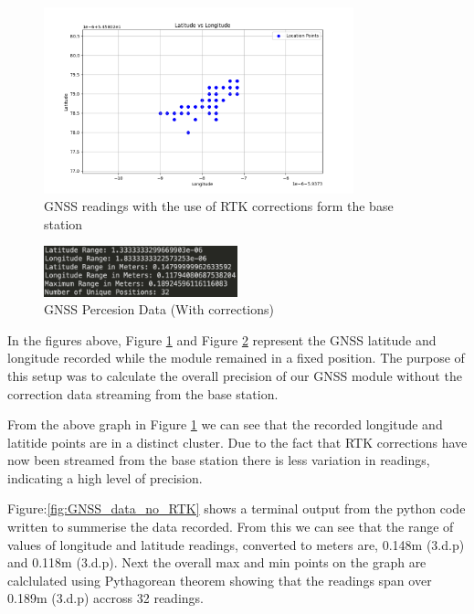 \documentclass{report}
\begin{document}
\begin{figure}[H]
  \centering
  \includegraphics[width=0.8\textwidth]{Pictures/GNSS_RTK.png}
  \caption{GNSS readings with the use of RTK corrections form the base station}
  \label{fig:GNSS_RTK}
\end{figure}

\begin{figure}[H]
  \centering
  \includegraphics[width=0.5\textwidth]{Pictures/GNSS_data_correction.png}
  \caption{GNSS Percesion Data (With corrections)}
  \label{fig:GNSS_data_RTK}
\end{figure}

In the figures above, Figure \ref{fig:GNSS_RTK} and
Figure \ref{fig:GNSS_data_RTK} represent the GNSS latitude and longitude
recorded while the module remained in a fixed position. The purpose of this
setup was to calculate the overall precision of our GNSS module without the
correction data streaming from the base station.

From the above graph in Figure \ref{fig:GNSS_RTK} we can see that the recorded
longitude and latitide points are in a distinct cluster. Due to the fact that
RTK corrections have now been streamed from the base station there is less
variation in readings, indicating a high level of precision.

Figure:\ref{fig:GNSS_data_no_RTK} shows a terminal output from the python code
written to summerise the data recorded. From this we can see that the range of
values of longitude and latitude readings, converted to meters are, 0.148m
(3.d.p) and  0.118m (3.d.p). Next the overall max and min points on the graph
are calclulated using Pythagorean theorem showing that the readings span over
0.189m (3.d.p) accross 32 readings.
\end{document}
